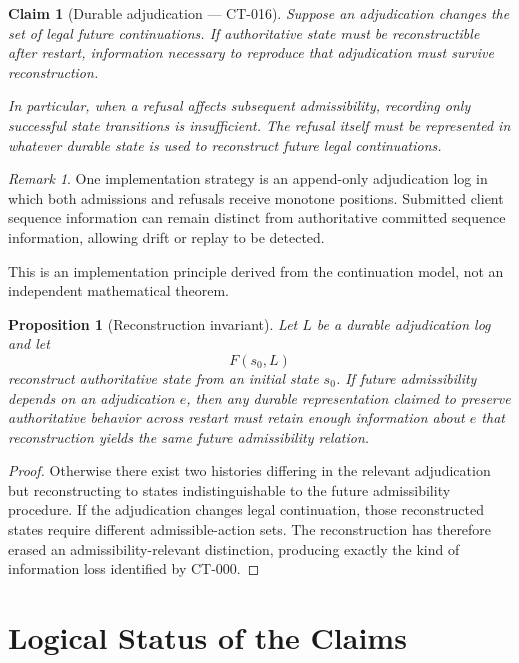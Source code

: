 \documentclass[11pt]{article}
\newtheorem{proposition}[theorem]{Proposition}
\newtheorem{claim}[theorem]{Claim}
\theoremstyle{definition}
\theoremstyle{remark}
\newtheorem{remark}[theorem]{Remark}
\begin{document}
\begin{claim}[Durable adjudication --- CT-016]
Suppose an adjudication changes the set of legal future continuations. If
authoritative state must be reconstructible after restart, information
necessary to reproduce that adjudication must survive reconstruction.

In particular, when a refusal affects subsequent admissibility, recording only
successful state transitions is insufficient. The refusal itself must be
represented in whatever durable state is used to reconstruct future legal
continuations.
\end{claim}

\begin{remark}
One implementation strategy is an append-only adjudication log in which both
admissions and refusals receive monotone positions. Submitted client sequence
information can remain distinct from authoritative committed sequence
information, allowing drift or replay to be detected.

This is an implementation principle derived from the continuation model, not
an independent mathematical theorem.
\end{remark}

\begin{proposition}[Reconstruction invariant]
Let $L$ be a durable adjudication log and let
\[
  F(s_0,L)
\]
reconstruct authoritative state from an initial state $s_0$. If future
admissibility depends on an adjudication $e$, then any durable representation
claimed to preserve authoritative behavior across restart must retain enough
information about $e$ that reconstruction yields the same future
admissibility relation.
\end{proposition}

\begin{proof}
Otherwise there exist two histories differing in the relevant adjudication
but reconstructing to states indistinguishable to the future admissibility
procedure. If the adjudication changes legal continuation, those reconstructed
states require different admissible-action sets. The reconstruction has
therefore erased an admissibility-relevant distinction, producing exactly the
kind of information loss identified by CT-000.
\end{proof}

\section{Logical Status of the Claims}
\end{document}
